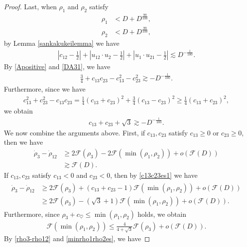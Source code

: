 \documentclass[reqno]{amsart}
\theoremstyle{plain}
\theoremstyle{definition}
\numberwithin{equation}{section}
\newcommand{\1}{\mathbbm{1}}
\begin{document}
\begin{proof}
Last, when $\rho_1$ and $\rho_2$ satisfy
\begin{align*}
\rho_1&<D+D^{\frac{99}{100}},
\\
\rho_2&<D+D^{\frac{99}{100}},
\end{align*}
by Lemma \ref{sankakukeilemma} we have
\begin{align}\label{DA31}
\left|c_{12}-\frac{1}{2}\right|+\left|u_{12}\cdot u_2-\frac{1}{2}\right|+\left|u_1\cdot u_{21}-\frac{1}{2}\right|\lesssim D^{-\frac{1}{100}}.
\end{align}
By \eqref{Apositive} and \eqref{DA31}, we have
\begin{align*}
\frac{3}{4}+c_{13}c_{23}-c_{13}^2-c_{23}^2\gtrsim -D^{-\frac{1}{100}}.
\end{align*}
Furthermore, since we have
\begin{align*}
c_{13}^2+c_{23}^2-c_{13}c_{23}=\frac{1}{4}\left(c_{13}+c_{23}\right)^2+\frac{3}{4}\left(c_{13}-c_{23}\right)^2\geq \frac{1}{4}\left(c_{13}+c_{23}\right)^2,
\end{align*}
we obtain
\begin{align}\label{c13c23es1}
c_{13}+c_{23}+\sqrt{3}\gtrsim -D^{-\frac{1}{100}}.
\end{align}
We now combine the arguments above. First, if $c_{13}, c_{23}$ satisfy $c_{13}\geq 0$ or $c_{23}\geq 0$, then we have
\begin{align*}
\dot{\rho}_3-\dot{\rho}_{12}&\geq 2\mathcal{F}(\rho_3)-2\mathcal{F}(\min{(\rho_1,\rho_2)})+o\left(\mathcal{F}(D)\right)
\\
&\gtrsim \mathcal{F}(D).
\end{align*}
If $c_{13}, c_{23}$ satisfy $c_{13}<0$ and $c_{23}<0$, then by \eqref{c13c23es1} we have
\begin{align}\label{rho3-rho12}
\begin{aligned}
\dot{\rho}_3-\dot{\rho}_{12}&\geq 2\mathcal{F}(\rho_3)+(c_{13}+c_{23}-1)\mathcal{F}(\min{(\rho_1,\rho_2)})+o\left(\mathcal{F}(D)\right)
\\
&\geq 2\mathcal{F}(\rho_3)-(\sqrt{3}+1)\mathcal{F}(\min{(\rho_1,\rho_2)})+o\left(\mathcal{F}(D)\right).
\end{aligned}
\end{align}
Furthermore, since $\rho_3+c_{\heartsuit}\leq \min{(\rho_1,\rho_2)}$ holds, we obtain
\begin{align}\label{minrho1rho2es}
\mathcal{F}(\min{(\rho_1,\rho_2)})\leq \frac{4}{4+\sqrt{3}}\mathcal{F}(\rho_3)+o\left(\mathcal{F}(D)\right).
\end{align}
By \eqref{rho3-rho12} and \eqref{minrho1rho2es}, we have

\end{proof}
\end{document}
